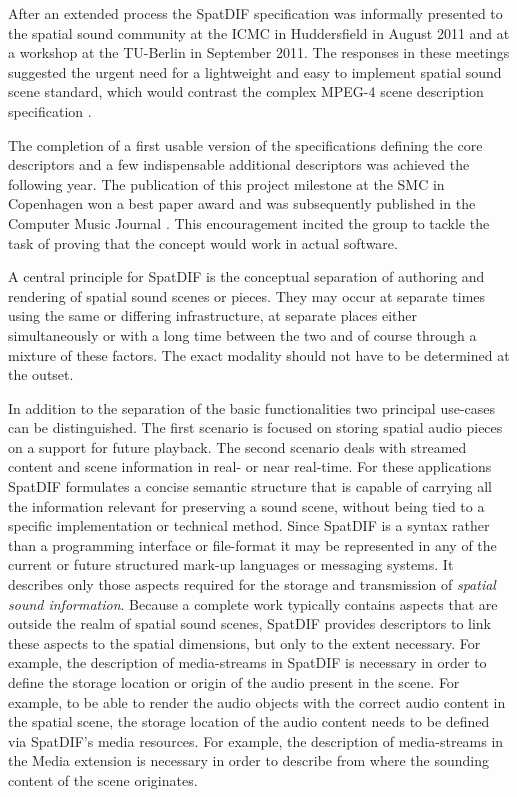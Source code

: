 \documentclass{article}
\begin{document}
After an extended process the SpatDIF specification was informally presented to the spatial sound community at the ICMC in Huddersfield in August 2011 and at a workshop at the TU-Berlin in September 2011.
The responses in these meetings suggested the urgent need for a lightweight and easy to implement spatial sound scene standard, which would contrast the complex MPEG-4 scene description specification \cite{scheirer1999audiobifs}.

The completion of a first usable version of the specifications \cite{SpatDIF_03} defining the core descriptors and a few indispensable additional descriptors was achieved the following year. The publication of this project milestone at the SMC in Copenhagen \cite{SpatDIF_SMC12} won a best paper award and was subsequently published in the Computer Music Journal \cite{Peters:2013SpatDifCMJ}.
This encouragement incited the group to tackle the task of proving that the concept would work in actual software.

A central principle for SpatDIF is the conceptual separation of authoring and rendering of spatial sound scenes or pieces. They may occur at separate times using the same or differing infrastructure, at separate places either simultaneously or with a long time between the two and of course through a mixture of these factors. 
The exact modality should not have to be determined at the outset.

In addition to the separation of the basic functionalities two principal use-cases can be distinguished.
The first scenario is focused on storing spatial audio pieces on a support for future playback. 
The second scenario deals with streamed content and scene information in real- or near real-time.
For these applications SpatDIF formulates a concise semantic structure that is capable of carrying all the information relevant for preserving a sound scene, without being tied to a specific implementation or technical method.
Since SpatDIF is a syntax rather than a programming interface or file-format it may be represented in any of the current or future structured mark-up languages or messaging systems.
It describes only those aspects required for the storage and transmission of \emph{spatial sound information}.
Because a complete work typically contains aspects that are outside the realm of spatial sound scenes, SpatDIF provides descriptors to link these aspects to the spatial dimensions, but only to the extent necessary.
For example, the description of media-streams in SpatDIF is necessary in order to define the storage location or origin of the audio present in the scene.
For example, to be able to render the audio objects with the correct audio content in the spatial scene, the storage location of the audio content needs to be defined via SpatDIF's media resources.
For example, the description of media-streams in the Media extension is necessary in order to describe from where the sounding content of the scene originates.
\end{document}
